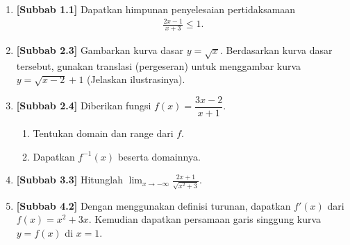 \documentclass[10pt,openany,a4paper]{article}
\theoremstyle{definition}
\theoremstyle{definition}
\theoremstyle{plain}
\begin{document}
\begin{enumerate}
    \item \textbf{[Subbab 1.1]} Dapatkan himpunan penyelesaian pertidaksamaan
    \begin{align*}
        \frac{2x-1}{x+3}\leq 1.
    \end{align*}

    \item \textbf{[Subbab 2.3]} Gambarkan kurva dasar $y=\sqrt{x}$. Berdasarkan kurva dasar tersebut, gunakan translasi (pergeseran) untuk menggambar kurva $y=\sqrt{x-2}+1$ (Jelaskan ilustrasinya).

    \item \textbf{[Subbab 2.4]} Diberikan fungsi $f(x)=\dfrac{3x-2}{x+1}$.
    \begin{enumerate}
        \item Tentukan domain dan range dari $f$.
        \item Dapatkan $f^{-1}(x)$ beserta domainnya.
    \end{enumerate}

    \item \textbf{[Subbab 3.3]} Hitunglah $\displaystyle\lim_{x\to-\infty}\frac{2x+1}{\sqrt{x^2+3}}$.

    \item \textbf{[Subbab 4.2]} Dengan menggunakan definisi turunan, dapatkan $f'(x)$ dari $f(x)=x^2+3x$. Kemudian dapatkan persamaan garis singgung kurva $y=f(x)$ di $x=1$.
\end{enumerate}

\newpage
\end{document}
